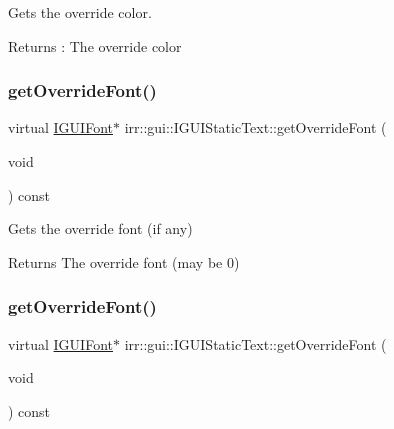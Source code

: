 Gets the override color. 

\begin{DoxyReturn}{Returns}
\+: The override color 
\end{DoxyReturn}
\mbox{\label{classirr_1_1gui_1_1IGUIStaticText_a581f18f3ffe650246125988b3b7dc44e}} 
\subsubsection{\texorpdfstring{get\+Override\+Font()}{getOverrideFont()}\hspace{0.1cm}{\footnotesize\ttfamily [1/2]}}
{\footnotesize\ttfamily virtual \hyperlink{classirr_1_1gui_1_1IGUIFont}{I\+G\+U\+I\+Font}$\ast$ irr\+::gui\+::\+I\+G\+U\+I\+Static\+Text\+::get\+Override\+Font (\begin{DoxyParamCaption}\item[{void}]{ }\end{DoxyParamCaption}) const\hspace{0.3cm}{\ttfamily [pure virtual]}}



Gets the override font (if any) 

\begin{DoxyReturn}{Returns}
The override font (may be 0) 
\end{DoxyReturn}
\mbox{\label{classirr_1_1gui_1_1IGUIStaticText_a581f18f3ffe650246125988b3b7dc44e}} 
\subsubsection{\texorpdfstring{get\+Override\+Font()}{getOverrideFont()}\hspace{0.1cm}{\footnotesize\ttfamily [2/2]}}
{\footnotesize\ttfamily virtual \hyperlink{classirr_1_1gui_1_1IGUIFont}{I\+G\+U\+I\+Font}$\ast$ irr\+::gui\+::\+I\+G\+U\+I\+Static\+Text\+::get\+Override\+Font (\begin{DoxyParamCaption}\item[{void}]{ }\end{DoxyParamCaption}) const\hspace{0.3cm}{\ttfamily [pure virtual]}}



